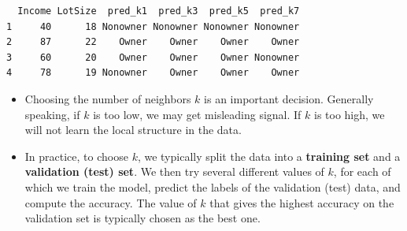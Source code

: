 \documentclass[
  letterpaper,
  DIV=11,
  numbers=noendperiod]{scrreprt}
\newenvironment{Shaded}{\begin{snugshade}}{\end{snugshade}}
\newcommand{\AttributeTok}[1]{\textcolor[rgb]{0.40,0.45,0.13}{#1}}
\newcommand{\DecValTok}[1]{\textcolor[rgb]{0.68,0.00,0.00}{#1}}
\newcommand{\FunctionTok}[1]{\textcolor[rgb]{0.28,0.35,0.67}{#1}}
\newcommand{\NormalTok}[1]{\textcolor[rgb]{0.00,0.23,0.31}{#1}}
\newcommand{\OtherTok}[1]{\textcolor[rgb]{0.00,0.23,0.31}{#1}}
\newcommand{\SpecialCharTok}[1]{\textcolor[rgb]{0.37,0.37,0.37}{#1}}
\begin{document}
\begin{Shaded}
\end{Shaded}

\begin{verbatim}
  Income LotSize  pred_k1  pred_k3  pred_k5  pred_k7
1     40      18 Nonowner Nonowner Nonowner Nonowner
2     87      22    Owner    Owner    Owner    Owner
3     60      20    Owner    Owner    Owner Nonowner
4     78      19 Nonowner    Owner    Owner    Owner
\end{verbatim}

\begin{itemize}
\item
  Choosing the number of neighbors \(k\) is an important decision.
  Generally speaking, if \(k\) is too low, we may get misleading signal.
  If \(k\) is too high, we will not learn the local structure in the
  data.
\item
  In practice, to choose \(k\), we typically split the data into a
  \textbf{training set} and a \textbf{validation (test) set}. We then
  try several different values of \(k\), for each of which we train the
  model, predict the labels of the validation (test) data, and compute
  the accuracy. The value of \(k\) that gives the highest accuracy on
  the validation set is typically chosen as the best one.
\end{itemize}
\end{document}
